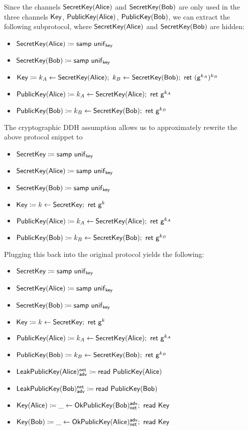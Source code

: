 \noindent Since the channels $\SecretKey(\Alice)$ and $\SecretKey(\Bob)$ are only used in the three channels $\Key$, $\PublicKey(\Alice)$, $\PublicKey(\Bob)$, we can extract the following subprotocol, where $\SecretKey(\Alice)$ and $\SecretKey(\Bob)$ are hidden:

\begin{itemize}
\item $\SecretKey(\Alice) \coloneqq \samp{\unif_\key}$
\item $\SecretKey(\Bob) \coloneqq \samp{\unif_\key}$
\item $\Key \coloneqq k_A \leftarrow \SecretKey(\Alice); \ k_B \leftarrow \SecretKey(\Bob); \ \ret{(\gen^{k_A})^{k_B}}$
\item $\PublicKey(\Alice) \coloneqq k_A \leftarrow \SecretKey(\Alice); \ \ret{\gen^{k_A}}$
\item $\PublicKey(\Bob) \coloneqq k_B \leftarrow \SecretKey(\Bob); \ \ret{\gen^{k_B}}$
\end{itemize}

\noindent The cryptographic DDH assumption allows us to approximately rewrite the above protocol snippet to

\begin{itemize}
\item $\SecretKey \coloneqq \samp{\unif_\key}$
\item $\SecretKey(\Alice) \coloneqq \samp{\unif_\key}$
\item $\SecretKey(\Bob) \coloneqq \samp{\unif_\key}$
\item $\Key \coloneqq k \leftarrow \SecretKey; \ \ret{\gen^k}$
\item $\PublicKey(\Alice) \coloneqq k_A \leftarrow \SecretKey(\Alice); \ \ret{\gen^{k_A}}$
\item $\PublicKey(\Bob) \coloneqq k_B \leftarrow \SecretKey(\Bob); \ \ret{\gen^{k_B}}$
\end{itemize}

\noindent Plugging this back into the original protocol yields the following:

\begin{itemize}
\item $\SecretKey \coloneqq \samp{\unif_\key}$
\item $\SecretKey(\Alice) \coloneqq \samp{\unif_\key}$
\item $\SecretKey(\Bob) \coloneqq \samp{\unif_\key}$
\item $\Key \coloneqq k \leftarrow \SecretKey; \ \ret{\gen^k}$
\item $\PublicKey(\Alice) \coloneqq k_A \leftarrow \SecretKey(\Alice); \ \ret{\gen^{k_A}}$
\item $\PublicKey(\Bob) \coloneqq k_B \leftarrow \SecretKey(\Bob); \ \ret{\gen^{k_B}}$
\item $\LeakPublicKey(\Alice)^\net_\adv \coloneqq \read{\PublicKey(\Alice)}$
\item $\LeakPublicKey(\Bob)^\net_\adv \coloneqq \read{\PublicKey(\Bob)}$
\item $\Key(\Alice) \coloneqq \_ \leftarrow \OkPublicKey(\Bob)^\adv_\net; \ \read{\Key}$
\item $\Key(\Bob) \coloneqq \_ \leftarrow \OkPublicKey(\Alice)^\adv_\net; \ \read{\Key}$
\end{itemize}


